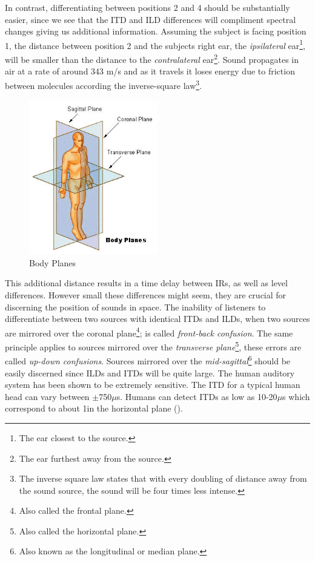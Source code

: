 In contrast, differentiating between positions 2 and 4 should be substantially easier, since we see that the ITD and ILD differences will compliment spectral changes giving us additional information. Assuming the subject is facing position 1, the distance between position 2 and the subjects right ear, the \textit{ipsilateral} ear\footnote{The ear closest to the source.}, will be smaller than the distance to the \textit{contralateral} ear\footnote{The ear furthest away from the source.}. Sound propagates in air at a rate of around 343 m/s and as it travels it loses energy due to friction between molecules according the inverse-square law\footnote{The inverse square law states that with every doubling of distance away from the sound source, the sound will be four times less intense.}. 

\begin{figure}[ht!]%
\centering
\includegraphics[width=0.5\textwidth]{img/body-planes.jpg}
\caption{Body Planes \cite{body_planes_pic}}
\label{fig:body-planes}
\end{figure}

This additional distance results in a time delay between IRs, as well as level differences. However small these differences might seem, they are crucial for discerning the position of sounds in space. The inability of listeners to differentiate between two sources with identical ITDs and ILDs, when two sources are mirrored over the coronal plane\footnote{Also called the frontal plane.}; is called \textit{front-back confusion}. The same principle applies to sources mirrored over the \textit{transverse plane}\footnote{Also called the horizontal plane.}, these errors are called \textit{up-down confusions}. Sources mirrored over the \textit{mid-sagittal}\footnote{Also known as the longitudinal or median plane.} should be easily discerned since ILDs and ITDs will be quite large. The human auditory system has been shown to be extremely sensitive. The ITD for a typical human head can vary between $\pm$750$\mu$s. Humans can detect ITDs as low as 10-20$\mu$s which correspond to about 1\textdegree in the horizontal plane (\cite{hacihabiboglu2017perceptual}). 

